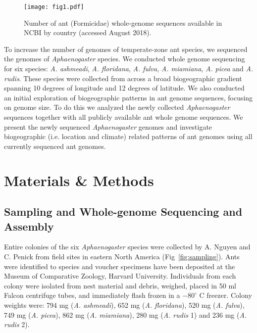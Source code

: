 \documentclass[fleqn,10pt,lineno]{wlpeerj} %
\begin{document}
\begin{figure}[ht]
\texttt{[image: fig1.pdf]}
\caption{Number of ant (Formicidae) whole-genome sequences available
  in NCBI by country (accessed August 2018).}
\label{fig:ant_world_usa}
\end{figure}

To increase the number of genomes of temperate-zone ant species, we
sequenced the genomes of \textit{Aphaenogaster} species. We conducted
whole genome sequencing for six species:  \textit{A. ashmeadi},
\textit{A. floridana}, \textit{A. fulva}, \textit{A. miamiana},
\textit{A. picea} and \textit{A. rudis}. These species were collected
from across a broad biogeographic gradient spanning 10 degrees of
longitude and 12 degrees of latitude. We also conducted an initial
exploration of biogeographic patterns in ant genome sequences,
focusing on genome size. To do this we analyzed the newly collected
\textit{Aphaenogaster} sequences together with all publicly available
ant whole genome sequences.  We present the newly sequenced
\textit{Aphaenogaster} genomes and investigate biogeographic
(i.e. location and climate) related patterns of ant genomes using all
currently sequenced ant genomes.

\section*{Materials \& Methods}

\subsection*{Sampling and Whole-genome Sequencing and Assembly}

Entire colonies of the six \textit{Aphaenogaster} species were
collected by A. Nguyen and C. Penick from field sites in eastern North
America (Fig~\ref{fig:sampling}). Ants were identified to species and
voucher specimens have been deposited at the Museum of Comparative
Zoology, Harvard University. Individuals from each colony were
isolated from nest material and debris, weighed, placed in 50 ml
Falcon centrifuge tubes, and immediately flash frozen in a
$-80^{\circ}$ C freezer. Colony weights were: 794 mg
(\textit{A. ashmeadi}), 652 mg (\textit{A. floridana}), 520 mg
(\textit{A. fulva}), 749 mg (\textit{A. picea}), 862 mg
(\textit{A. miamiana}), 280 mg (\textit{A. rudis} 1) and 236 mg
(\textit{A. rudis} 2).
\end{document}
